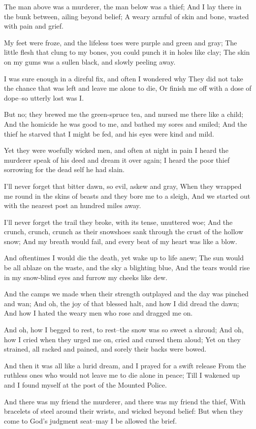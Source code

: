 
\begin{poemblock}
 The man above was a murderer, the man below was a thief;
 And I lay there in the bunk between, ailing beyond belief;
 A weary armful of skin and bone, wasted with pain and grief.

 My feet were froze, and the lifeless toes were purple and green and gray;
 The little flesh that clung to my bones,
   you could punch it in holes like clay;
 The skin on my gums was a sullen black, and slowly peeling away.

 I was sure enough in a direful fix, and often I wondered why
 They did not take the chance that was left and leave me alone to die,
 Or finish me off with a dose of dope--so utterly lost was I.

 But no; they brewed me the green-spruce tea,
   and nursed me there like a child;
 And the homicide he was good to me, and bathed my sores and smiled;
 And the thief he starved that I might be fed,
   and his eyes were kind and mild.

 Yet they were woefully wicked men, and often at night in pain
 I heard the murderer speak of his deed and dream it over again;
 I heard the poor thief sorrowing for the dead self he had slain.

 I'll never forget that bitter dawn, so evil, askew and gray,
 When they wrapped me round in the skins of beasts
   and they bore me to a sleigh,
 And we started out with the nearest post an hundred miles away.

 I'll never forget the trail they broke, with its tense, unuttered woe;
 And the crunch, crunch, crunch as their snowshoes sank
   through the crust of the hollow snow;
 And my breath would fail, and every beat of my heart was like a blow.

 And oftentimes I would die the death, yet wake up to life anew;
 The sun would be all ablaze on the waste, and the sky a blighting blue,
 And the tears would rise in my snow-blind eyes
   and furrow my cheeks like dew.

 And the camps we made when their strength outplayed
   and the day was pinched and wan;
 And oh, the joy of that blessed halt, and how I did dread the dawn;
 And how I hated the weary men who rose and dragged me on.

 And oh, how I begged to rest, to rest--the snow was so sweet a shroud;
 And oh, how I cried when they urged me on, cried and cursed them aloud;
 Yet on they strained, all racked and pained,
   and sorely their backs were bowed.

 And then it was all like a lurid dream, and I prayed for a swift release
 From the ruthless ones who would not leave me to die alone in peace;
 Till I wakened up and I found myself at the post of the Mounted Police.

 And there was my friend the murderer, and there was my friend the thief,
 With bracelets of steel around their wrists, and wicked beyond belief:
 But when they come to God's judgment seat--may I be allowed the brief.
\end{poemblock}
